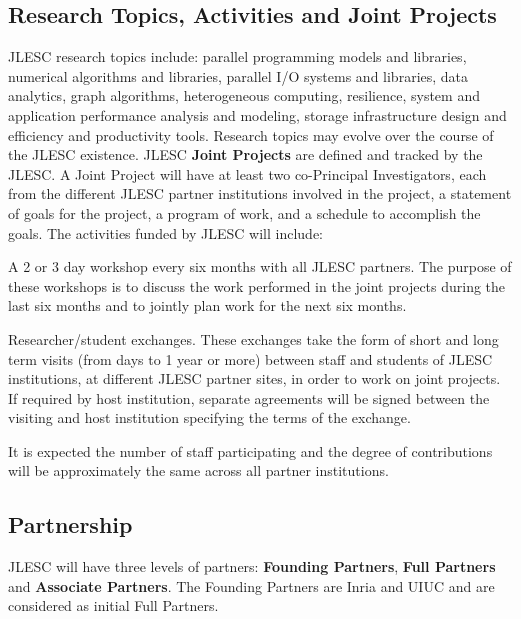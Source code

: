 \documentclass[12pt]{article}
\theoremstyle{definition}
\begin{document}
\subsection{Research Topics, Activities and Joint Projects} 
JLESC research topics include: parallel programming models and libraries, numerical algorithms and libraries, parallel I/O systems and libraries, data analytics, graph algorithms, heterogeneous computing, resilience, system and application performance analysis and modeling, storage infrastructure design and efficiency and productivity tools.  Research topics may evolve over the course of the JLESC existence.
JLESC \textbf{Joint Projects} are defined and tracked by the JLESC.  A Joint Project will have at least two co-Principal Investigators, each from the different JLESC partner institutions involved in the project, a statement of goals for the project, a program of work, and a  schedule to accomplish the goals.  The activities funded by JLESC will include:
\begin{compactenum}
\item A 2 or 3 day workshop every six months with all JLESC partners. The purpose of these workshops is to discuss the work performed in the joint projects during the last six months and to jointly plan work for the next six months. 
\item Researcher/student exchanges. These exchanges take the form of short and long term visits (from days to 1 year or more) between staff and students of JLESC institutions, at different JLESC partner sites, in order to work on joint projects. If required by host institution, separate agreements will be signed between the visiting and host institution specifying the terms of the exchange.
\end{compactenum}

It is expected the number of staff participating and the degree of contributions will be approximately the same across all partner institutions.

\subsection{Partnership}
JLESC will have three levels of partners: \textbf{Founding Partners}, \textbf{Full Partners} and \textbf{Associate Partners}.   
The Founding Partners are Inria and UIUC and are considered as initial Full Partners. 
\end{document}
